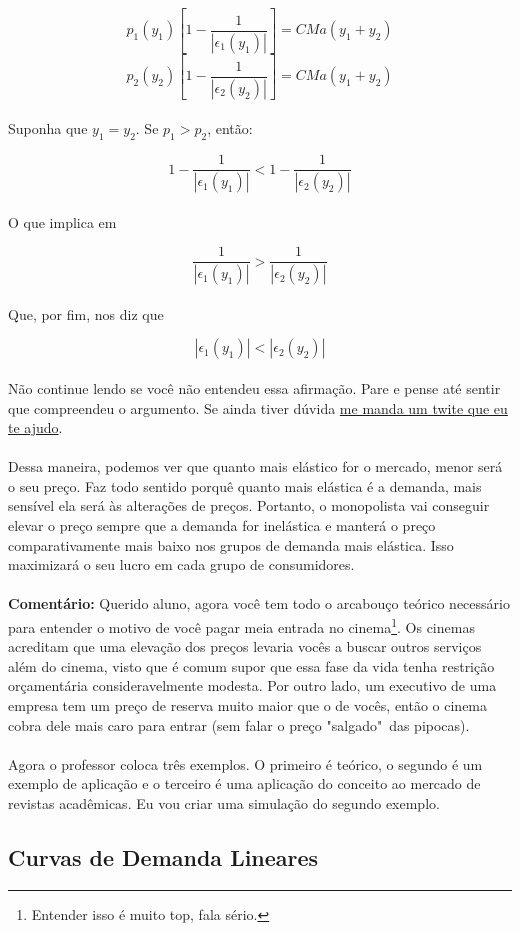 \documentclass[a4paper,11pt,oneside]{book}
\theoremstyle{definition}
\theoremstyle{break}
\begin{document}
$$ p_1(y_1) \left[1 - \frac{1}{|\epsilon_1(y_1)|} \right] = CMa(y_1 + y_2) $$
$$ p_2(y_2) \left[1 - \frac{1}{|\epsilon_2(y_2)|} \right] = CMa(y_1 + y_2) $$
\\
Suponha que $y_1 = y_2$. Se $p_1 > p_2$, então:

$$ 1 - \frac{1}{|\epsilon_1(y_1)|} < 1 - \frac{1}{|\epsilon_2(y_2)|} $$
\\
O que implica em

$$ \frac{1}{|\epsilon_1(y_1)|} > \frac{1}{|\epsilon_2(y_2)|} $$
\\
Que, por fim, nos diz que

$$ |\epsilon_1(y_1)| < |\epsilon_2(y_2)| $$
\\
Não continue lendo se você não entendeu essa afirmação. Pare e pense até sentir que compreendeu o argumento. Se ainda tiver dúvida \href{https://twitter.com/bruno_ruas2}{me manda um twite que eu te ajudo}.
\\
\\
Dessa maneira, podemos ver que quanto mais elástico for o mercado, menor será o seu preço. Faz todo sentido porquê quanto mais elástica é a demanda, mais sensível ela será às alterações de preços. Portanto, o monopolista vai conseguir elevar o preço sempre que a demanda for inelástica e manterá o preço comparativamente mais baixo nos grupos de demanda mais elástica. Isso maximizará o seu lucro em cada grupo de consumidores.
\\
\\
\textbf{Comentário:} Querido aluno, agora você tem todo o arcabouço teórico necessário para entender o motivo de você pagar meia entrada no cinema\footnote{Entender isso é muito top, fala sério.}. Os cinemas acreditam que uma elevação dos preços levaria vocês a buscar outros serviços além do cinema, visto que é comum supor que essa fase da vida tenha restrição orçamentária consideravelmente modesta. Por outro lado, um executivo de uma empresa tem um preço de reserva muito maior que o de vocês, então o cinema cobra dele mais caro para entrar (sem falar o preço "salgado"\ das pipocas).
\\
\\
Agora o professor coloca três exemplos. O primeiro é teórico, o segundo é um exemplo de aplicação e o terceiro é uma aplicação do conceito ao mercado de revistas acadêmicas. Eu vou criar uma simulação do segundo exemplo.

\subsection{Curvas de Demanda Lineares}
\end{document}
